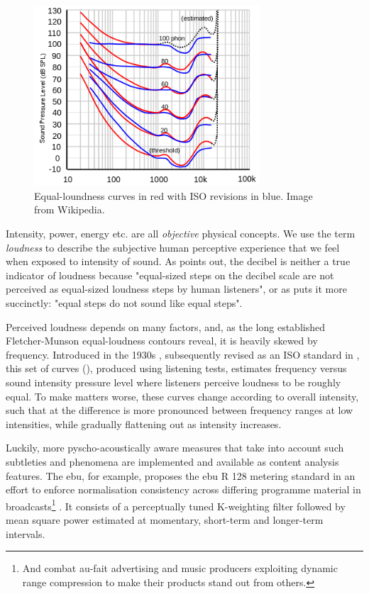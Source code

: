 {{\begin{figure}
	\begin{center}
		\includegraphics[width=0.75\textwidth]{ch05_pyconcat/figures/fletcher_munson.png}
	\end{center}
	\caption[Fletcher-Munson Curves]{Equal-loundness curves in red with ISO revisions in blue. Image from Wikipedia.}
	\label{fig:fletcher}
\end{figure}

Intensity, power, energy etc. are all \textit{objective} physical concepts. We use the term \textit{loudness} to describe the subjective human perceptive experience that we feel when exposed to intensity of sound. As \cite{Lerch2012} points out, the decibel is neither a true indicator of loudness because "equal-sized steps on the decibel scale are not perceived as equal-sized loudness steps by human listeners", or as \cite{Stevens1955} puts it more succinctly: "equal steps do not sound like equal steps".

Perceived loudness depends on many factors, and, as the long established  Fletcher-Munson equal-loudness contours reveal, it is heavily skewed by frequency. Introduced in the 1930s \citep{Fletcher1933}, subsequently revised as an ISO standard in \cite{countours}, this set of curves (), produced using listening tests, estimates frequency versus sound intensity pressure level where listeners perceive loudness to be roughly equal. To make matters worse, these curves change according to overall intensity, such that at  the difference is more pronounced between frequency ranges at low intensities, while gradually flattening out as intensity increases.

Luckily, more pyscho-acoustically aware measures that take into account such subtleties and phenomena are implemented and available as content analysis features. The \acrfull{ebu}, for example, proposes the \acrshort{ebu} R 128 metering standard in an effort to enforce normalisation consistency across differing programme material in broadcasts\footnote{And combat au-fait advertising and music producers exploiting dynamic range compression to make their products stand out from others.} \citep{ebu, Lerch2012}. It consists of a perceptually tuned K-weighting filter followed by mean square power estimated at momentary, short-term and longer-term intervals.

}}
